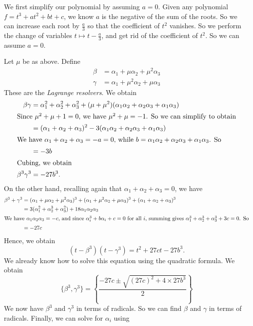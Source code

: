 \documentclass[a4paper]{article}
\begin{document}
We first simplify our polynomial by assuming $a = 0$. Given any polynomial $f = t^3 + at^2 + bt + c$, we know $a$ is the negative of the sum of the roots. So we can increase each root by $\frac{a}{3}$ so that the coefficient of $t^2$ vanishes. So we perform the change of variables $t\mapsto t - \frac{a}{3}$, and get rid of the coefficient of $t^2$. So we can assume $a = 0$.

Let $\mu$ be as above. Define
\begin{align*}
  \beta &= \alpha_1 + \mu \alpha_2 + \mu^2 \alpha_3\\
  \gamma &= \alpha_1 + \mu^2 \alpha_2 + \mu \alpha_3
\end{align*}
These are the \emph{Lagrange resolvers}. We obtain
\begin{align*}
  \beta\gamma &= \alpha_1^2 + \alpha_2^2 +\alpha_3^2 + (\mu + \mu^2)(\alpha_1\alpha_2 + \alpha_2\alpha_3 + \alpha_1\alpha_3)\\
  \intertext{Since $\mu^2 + \mu + 1 = 0$, we have $\mu^2 + \mu = -1$. So we can simplify to obtain}
  &= (\alpha_1 + \alpha_2 + \alpha_3)^2 - 3(\alpha_1\alpha_2 + \alpha_2\alpha_3 + \alpha_1\alpha_3)\\
  \intertext{We have $\alpha_1 + \alpha_2 + \alpha_3 = -a = 0$, while $b = \alpha_1\alpha_2 + \alpha_2\alpha_3 + \alpha_1\alpha_3$. So}
  &= -3b\\
  \intertext{Cubing, we obtain}
  \beta^3\gamma^3 &= -27b^3.
\end{align*}
On the other hand, recalling again that $\alpha_1 + \alpha_2 + \alpha_3 = 0$, we have
\begin{align*}
  \beta^3 + \gamma^3 &= (\alpha_1 + \mu \alpha_2 + \mu^2 \alpha_3)^3 + (\alpha_1 + \mu^2\alpha_2 + \mu \alpha_3)^3 + (\alpha_1 + \alpha_2 + \alpha_3)^3\\
  &= 3(\alpha_1^2 + \alpha_2^3 + \alpha_3^2) + 18\alpha_1\alpha_2\alpha_3\\
  \intertext{We have $\alpha_1\alpha_2\alpha_3 = -c$, and since $\alpha_i^3 + b\alpha_i + c = 0$ for all $i$, summing gives $\alpha_1^3 + \alpha_2^3 + \alpha_3^3 + 3c = 0$. So}
  &= -27c
\end{align*}
Hence, we obtain
\[
  (t - \beta^3)(t - \gamma^3) = t^2 + 27ct - 27b^3.
\]
We already know how to solve this equation using the quadratic formula. We obtain
\[
  \{\beta^3, \gamma^3\} = \left\{\frac{-27 c \pm \sqrt{(27c)^2 + 4\times 27b^3}}{2}\right\}
\]
We now have $\beta^3$ and $\gamma^3$ in terms of radicals. So we can find $\beta$ and $\gamma$ in terms of radicals. Finally, we can solve for $\alpha_i$ using
\end{document}
